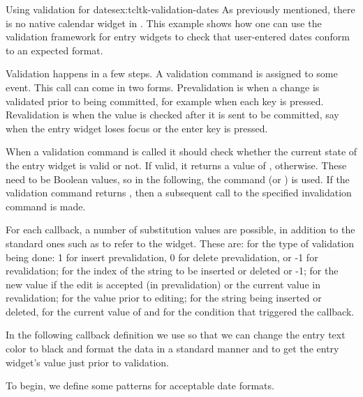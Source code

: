 \begin{example}{Using validation for dates}{ex:tcltk-validation-dates}
As previously mentioned, there is no native calendar widget in
. This example shows how one can use the validation
framework for entry widgets to check that user-entered dates conform
to an expected format.
%
%

Validation happens in a few steps.  A validation command is assigned
to some event. This call can come in two forms. Prevalidation is when
a change is validated prior to being committed, for example when each key
is pressed.  Revalidation is when the value is checked
after it is sent to be committed, say when the entry widget loses
focus or the enter key is pressed.

When a validation command is called it should check
whether the current state of the entry widget is valid or not. If
valid, it returns a value of , 
otherwise. These need to be \TCL\/ Boolean values, so in the following,
the command  (or ) is used. If
the validation command returns , then a subsequent call to
the specified invalidation command is made.

For each callback, a number of substitution values are possible, in
addition to the standard ones such as  to refer to the
widget. These are:  for the type of validation being done: 1
for insert prevalidation, 0 for delete prevalidation, or -1 for
revalidation;  for the index of the string to be inserted or
deleted or -1;  for the new value if the edit is accepted (in
prevalidation) or the current value in revalidation;  for the
value prior to editing;  for the string being inserted or
deleted,  for the current value of  and
 for the condition that triggered the callback.

In the following callback definition we use  so that we can change the entry text color to black and format the data in a standard manner and  to get the entry widget's value just prior to validation.


To begin,  we define some patterns for acceptable date formats.
\begin{Schunk}
\end{Schunk}


\end{example}
